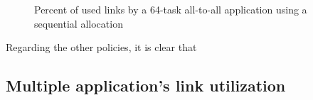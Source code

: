 \documentclass{sig-alternate}
\begin{document}
\begin{figure}[t]
    \centering 
    \caption{Percent of used links by a 64-task all-to-all application using a sequential allocation}
    \label{fig:link_usage}
\end{figure}

Regarding the other policies, it is clear that  


\subsection{Multiple application's link utilization}
\label{linkutilizationmultiapp}
\end{document}
